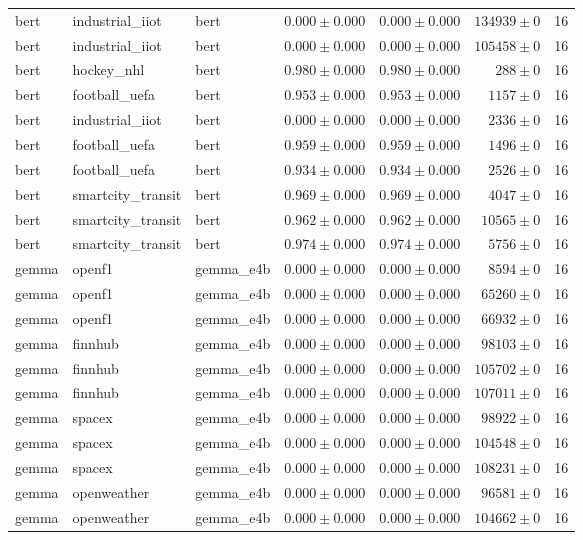\begin{table}[htbp]
\begin{tabular}{l l l r r r r}
bert & industrial\_iiot & bert & $0.000\pm0.000$ & $0.000\pm0.000$ & $134939\pm0$ & 16 \\
bert & industrial\_iiot & bert & $0.000\pm0.000$ & $0.000\pm0.000$ & $105458\pm0$ & 16 \\
bert & hockey\_nhl & bert & $0.980\pm0.000$ & $0.980\pm0.000$ & $288\pm0$ & 16 \\
bert & football\_uefa & bert & $0.953\pm0.000$ & $0.953\pm0.000$ & $1157\pm0$ & 16 \\
bert & industrial\_iiot & bert & $0.000\pm0.000$ & $0.000\pm0.000$ & $2336\pm0$ & 16 \\
bert & football\_uefa & bert & $0.959\pm0.000$ & $0.959\pm0.000$ & $1496\pm0$ & 16 \\
bert & football\_uefa & bert & $0.934\pm0.000$ & $0.934\pm0.000$ & $2526\pm0$ & 16 \\
bert & smartcity\_transit & bert & $0.969\pm0.000$ & $0.969\pm0.000$ & $4047\pm0$ & 16 \\
bert & smartcity\_transit & bert & $0.962\pm0.000$ & $0.962\pm0.000$ & $10565\pm0$ & 16 \\
bert & smartcity\_transit & bert & $0.974\pm0.000$ & $0.974\pm0.000$ & $5756\pm0$ & 16 \\
gemma & openf1 & gemma\_e4b & $0.000\pm0.000$ & $0.000\pm0.000$ & $8594\pm0$ & 16 \\
gemma & openf1 & gemma\_e4b & $0.000\pm0.000$ & $0.000\pm0.000$ & $65260\pm0$ & 16 \\
gemma & openf1 & gemma\_e4b & $0.000\pm0.000$ & $0.000\pm0.000$ & $66932\pm0$ & 16 \\
gemma & finnhub & gemma\_e4b & $0.000\pm0.000$ & $0.000\pm0.000$ & $98103\pm0$ & 16 \\
gemma & finnhub & gemma\_e4b & $0.000\pm0.000$ & $0.000\pm0.000$ & $105702\pm0$ & 16 \\
gemma & finnhub & gemma\_e4b & $0.000\pm0.000$ & $0.000\pm0.000$ & $107011\pm0$ & 16 \\
gemma & spacex & gemma\_e4b & $0.000\pm0.000$ & $0.000\pm0.000$ & $98922\pm0$ & 16 \\
gemma & spacex & gemma\_e4b & $0.000\pm0.000$ & $0.000\pm0.000$ & $104548\pm0$ & 16 \\
gemma & spacex & gemma\_e4b & $0.000\pm0.000$ & $0.000\pm0.000$ & $108231\pm0$ & 16 \\
gemma & openweather & gemma\_e4b & $0.000\pm0.000$ & $0.000\pm0.000$ & $96581\pm0$ & 16 \\
gemma & openweather & gemma\_e4b & $0.000\pm0.000$ & $0.000\pm0.000$ & $104662\pm0$ & 16 \\

\end{tabular}
\end{table}
